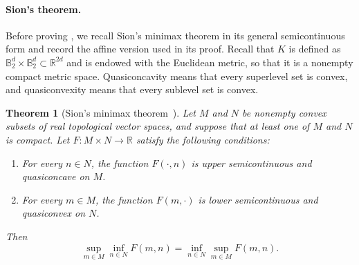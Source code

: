 \documentclass[11pt]{article}
\newtheorem{theorem}{Theorem}[section]
\newcommand{\R}{\mathbb R}
\begin{document}
\paragraph{Sion's theorem.}
Before proving {,} we recall Sion's minimax theorem in its general semicontinuous form and record the affine version used in its proof. {Recall that} $K$ is defined as $\mathbb B_2^d\times\mathbb B_2^d\subset\R^{2d}$ and is endowed with the Euclidean metric, so that it is a {nonempty} compact metric space. Quasiconcavity means that every superlevel set is convex, and quasiconvexity means that every sublevel set is convex.

\begin{theorem}[Sion's minimax theorem~{\cite{Sion58}}]\label{thm:sion-minimax}
Let $M$ and $N$ be nonempty convex subsets of real topological vector spaces, and suppose that at least one of $M$ and $N$ is compact. Let $F:M\times N\to\R$ satisfy the following conditions:
\begin{enumerate}
 \item For every $n\in N$, the function $ F(\cdot,n)$ is upper semicontinuous and quasiconcave on $M$.
 \item For every $m\in M$, the function $F(m,\cdot)$ is lower semicontinuous and quasiconvex on $N$.
\end{enumerate}
Then
\[
 \sup_{m\in M}\inf_{n\in N}F(m,n)
 =\inf_{n\in N}\sup_{m\in M}F(m,n).
\]
\end{theorem}
\end{document}
